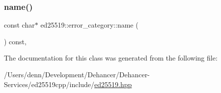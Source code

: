 \mbox{\label{classed25519_1_1error__category_a4bdacefbd1473eea02c945905230b6ce}} 
\subsubsection{\texorpdfstring{name()}{name()}}
{\footnotesize\ttfamily const char$\ast$ ed25519\+::error\+\_\+category\+::name (\begin{DoxyParamCaption}{ }\end{DoxyParamCaption}) const\hspace{0.3cm}{\ttfamily [override]}, {\ttfamily [noexcept]}}



The documentation for this class was generated from the following file\+:\begin{DoxyCompactItemize}
\item 
/\+Users/denn/\+Development/\+Dehancer/\+Dehancer-\/\+Services/ed25519cpp/include/\mbox{\hyperlink{ed25519_8hpp}{ed25519.\+hpp}}\end{DoxyCompactItemize}
